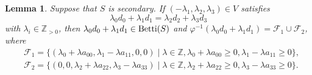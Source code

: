 \documentclass[12pt]{article}
\newtheorem{lemma}[thm]{Lemma}
\theoremstyle{remark}
\begin{document}
\begin{lemma}\label{lemma_catenary_lambda1_secondary}
    Suppose that $S$ is secondary.  If $(-\lambda_1,\lambda_2,\lambda_3) \in V$ satisfies
    $$ \lambda_0d_0 + \lambda_1d_1 = \lambda_2d_2 + \lambda_3d_3$$
    with $\lambda_i \in \mathbb{Z}_{>0}$, then $\lambda_0d_0 + \lambda_1d_1 \in \textup{Betti}(S)$ and $\varphi^{-1}(\lambda_0d_0 + \lambda_1d_1) = \mathcal{F}_1 \cup \mathcal{F}_2$, where 
    \begin{align*}
        &\mathcal{F}_1 =  \{(\lambda_0 + \lambda a_{00},\lambda_1 - \lambda a_{11},0,0) \mid \lambda \in \mathbb{Z}, \lambda_0 + \lambda a_{00} \geq 0,\lambda_1 - \lambda a_{11} \geq 0\}, \\
        &\mathcal{F}_2 =  \{(0,0,\lambda_2 + \lambda a_{22},\lambda_3 - \lambda a_{33}) \mid \lambda \in \mathbb{Z}, \lambda_2 + \lambda a_{22} \geq 0,\lambda_3 - \lambda a_{33} \geq 0\}.
    \end{align*}
  
\end{lemma}
\end{document}
